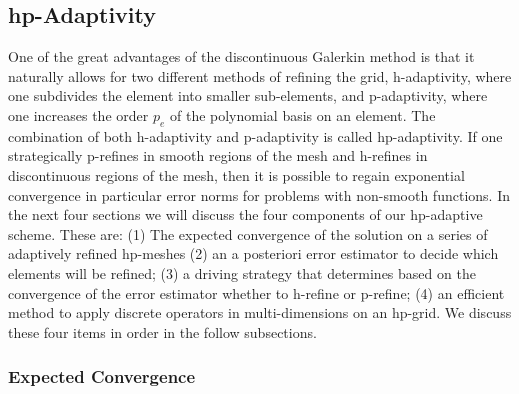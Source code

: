 %

\subsection{hp-Adaptivity}
\label{sec:hp-adaptivity}

One of the great advantages of the discontinuous Galerkin method is
that it naturally allows for two different methods of refining the
grid, h-adaptivity, where one subdivides the element into
smaller sub-elements, and p-adaptivity, where one
increases the order $p_e$ of the polynomial basis on an element. The
combination of both h-adaptivity and p-adaptivity is called
hp-adaptivity. If one strategically p-refines in smooth regions of the
mesh and h-refines in discontinuous regions of the mesh, then it is
possible to regain exponential convergence in particular error norms
for problems with non-smooth functions. In the next four sections we
will discuss the four components of our hp-adaptive scheme. These are:
(1) The expected convergence of the solution on a series of adaptively refined hp-meshes (2) an a posteriori error estimator to decide which elements will be refined; (3) a driving strategy that determines based
on the convergence of the error estimator whether to h-refine
or p-refine; (4) an efficient method to apply discrete operators in multi-dimensions on an hp-grid. We discuss these four items in order in the follow subsections.

\subsubsection{Expected Convergence}
\label{sec:expectedconvergence}


